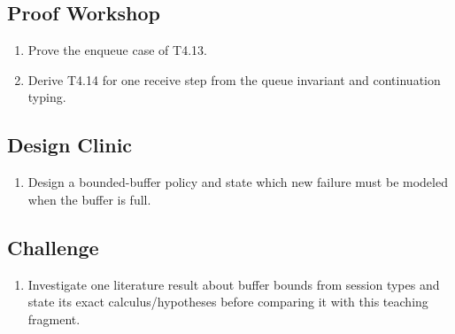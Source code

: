 \subsection*{Proof Workshop}
\begin{enumerate}[label=\textbf{8.\arabic*},start=9]
\item Prove the enqueue case of T4.13.
\item Derive T4.14 for one receive step from the queue invariant and continuation typing.
\end{enumerate}
\subsection*{Design Clinic}
\begin{enumerate}[label=\textbf{8.\arabic*},start=11]
\item Design a bounded-buffer policy and state which new failure must be modeled when the buffer is full.
\end{enumerate}
\subsection*{Challenge}
\begin{enumerate}[label=\textbf{8.\arabic*},start=12]
\item Investigate one literature result about buffer bounds from session types and state its exact calculus/hypotheses before comparing it with this teaching fragment.
\end{enumerate}
